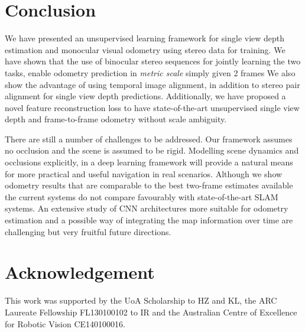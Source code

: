 \documentclass[10pt,twocolumn,letterpaper]{article}
\begin{document}
\section{Conclusion} \label{sec_conclusion}
We have presented an unsupervised learning framework for single view depth estimation and monocular visual odometry using stereo data for training. 
We have shown that the use of binocular stereo sequences for jointly learning the two tasks, enable odometry prediction in \emph{metric scale} simply given 2 frames
We also show the advantage of using temporal image alignment, in addition to stereo pair alignment for single view depth predictions. %
Additionally, we have proposed a novel feature reconstruction loss to have state-of-the-art unsupervised single view depth and frame-to-frame odometry without scale ambiguity.  

There are still a number of challenges to be addressed. 
Our framework assumes no occlusion and the scene is assumed to be rigid. Modelling scene dynamics and occlusions explicitly, in a deep learning framework will provide a natural means for more practical and useful navigation in real scenarios. 
Although we show odometry results that are comparable to the best two-frame estimates available the current systems do not compare favourably with state-of-the-art SLAM systems. An extensive study of CNN architectures more suitable for odometry estimation and a possible way of integrating the map information over time are challenging but very fruitful future directions. 

\section{Acknowledgement}
This work was supported by the UoA Scholarship to HZ and KL, the ARC Laureate Fellowship FL130100102 to IR and the Australian Centre of Excellence for Robotic Vision CE140100016.

\clearpage{\small

% 

}
\end{document}
